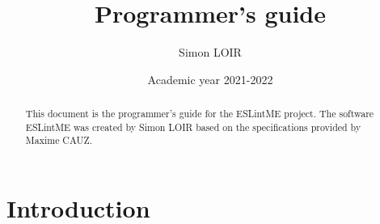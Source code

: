 \documentclass[12pt]{article}
\title{Programmer's guide}
\author{Simon LOIR}
\date{Academic year 2021-2022}
\begin{document}
\begin{titlepage}
\maketitle
\begin{abstract}
\noindent    
This document is the programmer's guide for the ESLintME project. 
The software ESLintME was created by Simon LOIR based on the specifications provided by Maxime CAUZ.
\end{abstract}
\end{titlepage}

\section{Introduction}






\end{document}
